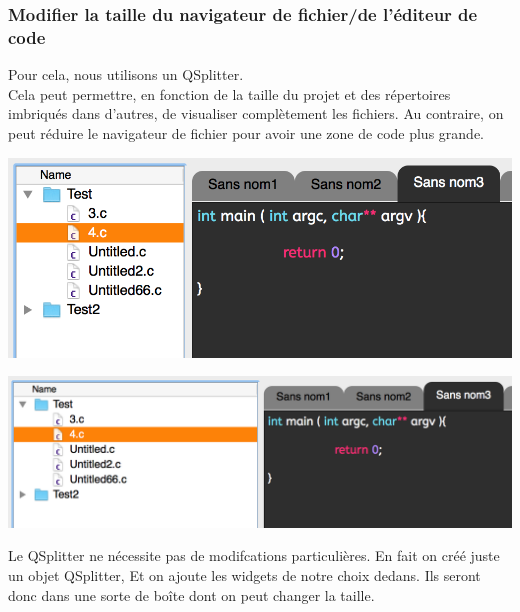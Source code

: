 \documentclass[a4paper,12pt]{article}
\begin{document}
			\subsubsection*{Modifier la taille du navigateur de fichier/de l'éditeur de code}
			Pour cela, nous utilisons un QSplitter.\\ 
			Cela peut permettre, en fonction de la taille du projet et des répertoires imbriqués dans d'autres, de visualiser complètement les fichiers. Au contraire, on peut réduire le navigateur de fichier pour avoir une zone de code plus grande.\\
			\begin{center}
				\includegraphics[scale=0.6]{images/QSplitter_1}
				\vspace{0.6cm}
			\end{center}

			\begin{center}
				\includegraphics[scale=0.6]{images/QSplitter_2}
				\vspace{0.6cm}
			\end{center}
			Le QSplitter ne nécessite pas de modifcations particulières. En fait on créé juste un objet QSplitter, Et on ajoute les widgets de notre choix dedans. Ils seront donc dans une sorte de boîte dont on peut changer la taille.\\
			
			
\end{document}
